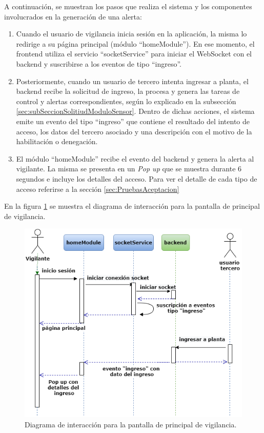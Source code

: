 A continuación, se muestran los pasos que realiza el sistema y los componentes involucrados en la generación de una alerta:
\begin{enumerate}
\item Cuando el usuario de vigilancia inicia sesión en la aplicación, la misma lo redirige a su página principal (módulo ``homeModule''). En ese momento, el frontend utiliza el servicio ``socketService'' para iniciar el WebSocket con el backend y suscribirse a los eventos de tipo ``ingreso''.
\item Posteriormente, cuando un usuario de tercero intenta ingresar a planta, el backend recibe la solicitud de ingreso, la procesa y genera las tareas de control y alertas correspondientes, según lo explicado en la subsección \ref{sec:subSeccionSolitiudModuloSensor}. Dentro de dichas acciones, el sistema emite un evento del tipo ``ingreso'' que contiene el resultado del intento de acceso, los datos del tercero asociado y una descripción con el motivo de la habilitación o denegación.
\item El módulo ``homeModule'' recibe el evento del backend y genera la alerta al vigilante. La misma se presenta en un \textit{Pop up} que se muestra durante 6 segundos e incluye los detalles del acceso. Para ver el detalle de cada tipo de acceso referirse a la sección \ref{sec:PruebasAceptacion}
\end{enumerate}

En la figura \ref{fig:DiagramaInteraccionVigi} se muestra el diagrama de interacción para la pantalla de principal de vigilancia.

\begin{figure}[ht]
	\centering
	\includegraphics[width=1\textwidth]{./Figures/DiagramaInteraccionVigi.png}
	\caption{Diagrama de interacción para la pantalla de principal de vigilancia.}
	\label{fig:DiagramaInteraccionVigi}
\end{figure}

